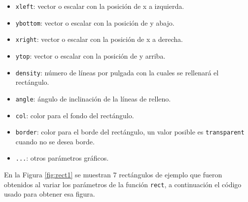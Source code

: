 \documentclass[10pt,]{krantz}
\providecommand{\tightlist}{%
  \setlength{\itemsep}{0pt}\setlength{\parskip}{0pt}}
\begin{document}
\begin{itemize}
\tightlist
\item
  \texttt{xleft}: vector o escalar con la posición de x a izquierda.
\item
  \texttt{ybottom}: vector o escalar con la posición de y abajo.
\item
  \texttt{xright}: vector o escalar con la posición de x a derecha.
\item
  \texttt{ytop}: vector o escalar con la posición de y arriba.
\item
  \texttt{density}: número de líneas por pulgada con la cuales se
  rellenará el rectángulo.
\item
  \texttt{angle}: ángulo de inclinación de la líneas de relleno.
\item
  \texttt{col}: color para el fondo del rectángulo.
\item
  \texttt{border}: color para el borde del rectángulo, un valor posible
  es \texttt{\textquotesingle{}transparent\textquotesingle{}} cuando no
  se desea borde.
\item
  \texttt{...}: otros parámetros gráficos.
\end{itemize}

En la Figura \ref{fig:rect1} se muestran 7 rectángulos de ejemplo que
fueron obtenidos al variar los parámetros de la función \texttt{rect}, a
continuación el código usado para obtener esa figura.
\end{document}
